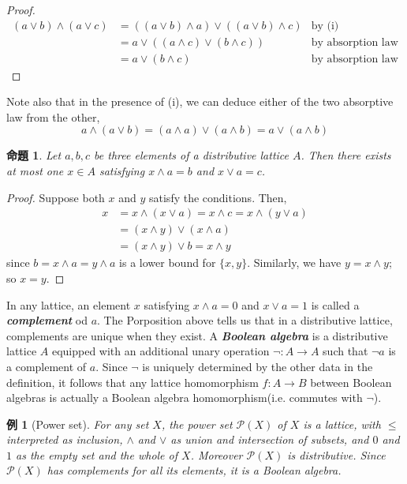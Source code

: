 \documentclass[a4j,12pt]{jarticle}
\numberwithin{equation}{section}
\newtheorem{example}{例}[section]
\newcommand{\itbf}[1]{\textit{\textbf{#1}}}
\newtheorem{prop}[thm]{命題}
\begin{document}
\begin{proof}
  \begin{align*}
    (a \vee b) \wedge (a \vee c) &= ((a \vee b) \wedge a) \vee ((a \vee b) \wedge c) &\text{by (i)}\\
                                 &= a \vee ((a \wedge c) \vee (b \wedge c)) &\text{by absorption law}\\
                                 &= a \vee (b \wedge c) &\text{by absorption law}
  \end{align*}
\end{proof}
Note also that in the presence of (i), we can deduce either of the two absorptive law from the other,
\begin{equation}
  a \wedge (a \vee b) = (a \wedge a) \vee (a \wedge b) = a \vee (a \wedge b)
\end{equation}
\begin{prop}
  Let $a,b,c$ be three elements of a distributive lattice $A$. Then there exists at most one $x \in A$ satisfying $x \wedge a = b$ and $x \vee a = c$.
\end{prop}
\begin{proof}
  Suppose both $x$ and $y$ satisfy the conditions. Then,
  \begin{align*}
    x &= x \wedge (x \vee a) = x \wedge c = x \wedge (y \vee a) \\
      &= (x \wedge y) \vee (x \wedge a)\\
      &= (x \wedge y) \vee b = x \wedge y
  \end{align*}
  since $b = x \wedge a = y \wedge a$ is a lower bound for $\{x,y\}$. Similarly, we have $y = x \wedge y$; so $x=y$.
\end{proof}
In any lattice, an element $x$ satisfying $x\wedge a = 0$ and $x \vee a = 1$ is called a \itbf{complement} od $a$.
The Porposition above tells us that in a distributive lattice, complements are unique when they exist.
A \itbf{Boolean algebra} is a distributive lattice $A$ equipped with an additional unary operation $\neg :A \rightarrow A$ such that $\neg a$ is a complement of $a$.
Since $\neg$ is uniquely determined by the other data in the definition, it follows that any lattice homomorphism $f:A\rightarrow B$ between Boolean algebras is actually a Boolean algebra homomorphism(i.e. commutes with $\neg$).
\begin{example}[Power set]
  For any set $X$, the power set $\mathcal{P}(X)$ of $X$ is a lattice, with $\le$ interpreted as inclusion, $\wedge$ and $\vee$ as union and intersection of subsets, and $0$ and $1$ as the empty set and the whole of $X$. Moreover $\mathcal{P}(X)$ is distributive. Since $\mathcal{P}(X)$ has complements for all its elements, it is a Boolean algebra.
\end{example}
\end{document}
